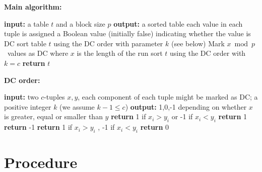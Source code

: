 \documentclass[11pt]{article}
\newcommand{\daniel}[1]{{\textbf{{\small{\color{magenta}DL}: #1{\color{magenta}$\circ$}}}}}
\newcommand{\owen}[1]{\textbf{{\small{\color{red}OK}: #1{\color{red}$\circ$}}}}
\begin{document}
\begin{algorithm}
{
	\textbf{Main algorithm:}
\begin{algorithmic}[1]
\STATE \textbf{input:} a table $t$ and a block size $p$
\STATE \textbf{output:} a sorted table
\STATE each value in each tuple is assigned a Boolean value (initially false) indicating whether the value is DC
\STATE sort table $t$ %
using the DC order with parameter $k$ (see below)
\STATE Mark %
                                       $x \bmod p$~values 
as DC where $x$ is the length of the run 
\ENDFOR
\ENDFOR
\STATE sort $t$ using the DC order with $k=c$
\STATE \textbf{return} $t$
\end{algorithmic}
}
\textbf{DC order:}
{
\begin{algorithmic}[1]
\STATE \textbf{input:} two $c$-tuples $x,y$, each component of each tuple might be marked as DC; a positive integer $k$ (we assume $k-1\leq c$)
\STATE \textbf{output:} 1,0,-1 depending on whether $x$ is greater, equal or smaller than $y$ 
\STATE \textbf{return} 1 if $x_i>y_i$ or -1 if $x_i<y_i$
\STATE \textbf{return} 1
\STATE \textbf{return} -1
\ENDIF
\ENDFOR
{}
\STATE \textbf{return} 1 if $x_i>y_i$ , -1 if $x_i<y_i$
\ENDFOR
\STATE \textbf{return} 0 
\end{algorithmic}
}
\caption{\label{algo:dcsort}The \textsc{DCSort} heuristic %
}

\end{algorithm}



\section{Procedure} %
\label{sec:procedure}
\end{document}
